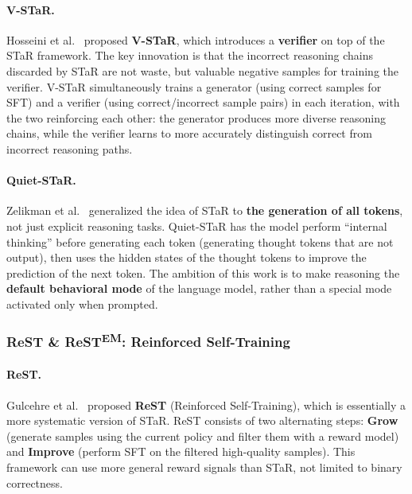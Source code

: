 \paragraph{V-STaR.}
Hosseini et al.\ \cite{hosseini2024vstar} proposed \textbf{V-STaR},
which introduces a \textbf{verifier} on top of the STaR framework.
The key innovation is that the incorrect reasoning chains discarded by STaR are not waste,
but valuable negative samples for training the verifier.
V-STaR simultaneously trains a generator (using correct samples for SFT) and a verifier (using correct/incorrect sample pairs) in each iteration,
with the two reinforcing each other: the generator produces more diverse reasoning chains,
while the verifier learns to more accurately distinguish correct from incorrect reasoning paths.

\paragraph{Quiet-STaR.}
Zelikman et al.\ \cite{zelikman2024quietstar} generalized the idea of STaR to
\textbf{the generation of all tokens}, not just explicit reasoning tasks.
Quiet-STaR has the model perform ``internal thinking'' before generating each token
(generating thought tokens that are not output),
then uses the hidden states of the thought tokens to improve the prediction of the next token.
The ambition of this work is to make reasoning the \textbf{default behavioral mode} of the language model,
rather than a special mode activated only when prompted.

\subsubsection{\texorpdfstring{ReST \& ReST\textsuperscript{EM}: Reinforced Self-Training}{ReST \& ReST-EM: Reinforced Self-Training}}

\paragraph{ReST.}
Gulcehre et al.\ \cite{gulcehre2023rest} proposed \textbf{ReST} (Reinforced Self-Training),
which is essentially a more systematic version of STaR.
ReST consists of two alternating steps:
\textbf{Grow} (generate samples using the current policy and filter them with a reward model) and
\textbf{Improve} (perform SFT on the filtered high-quality samples).
This framework can use more general reward signals than STaR, not limited to binary correctness.

